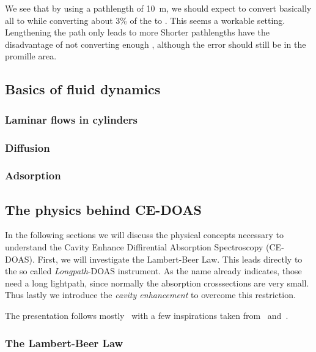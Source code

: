 We see that by using a pathlength of \SI{10}{\meter}, we should expect
to convert basically all  to  while converting about
3\% of the  to . This seems a workable
setting. Lengthening the path only leads to more  Shorter
pathlengths have the disadvantage of not converting enough ,
although the error should still be in the promille area.

\subsection{Basics of fluid dynamics}
\label{sec:fluid}

\subsubsection{Laminar flows in cylinders}
\label{sec:cylinder}

\subsubsection{Diffusion}
\label{sec:diffusion}

\subsubsection{Adsorption}
\label{sec:adsorption}

\subsection{The physics behind CE-DOAS}
\label{sec:ce-doas-physics}

In the following sections we will discuss the physical concepts
necessary to understand the Cavity Enhance Diffirential Absorption
Spectroscopy (CE-DOAS). First, we will investigate the Lambert-Beer
Law. This leads directly to the so called \emph{Longpath}-DOAS
instrument. As the name already indicates, those need a long
lightpath, since normally the absorption crosssections are very
small. Thus lastly we introduce the \emph{cavity enhancement} to
overcome this restriction.

The presentation follows mostly~\cite{fp58} with a few inspirations
taken from~\cite{bsc} and~\cite{platt2008differential}.

\subsubsection{The Lambert-Beer Law}
\label{sec:lambert-beer}

